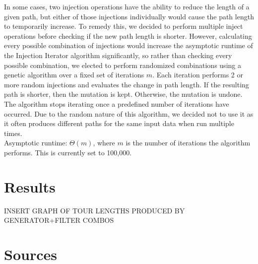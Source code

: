 \documentclass{article}
\begin{document}
In some cases, two injection operations have the ability to reduce the length
of a given path, but either of those injections individually would cause the
path length to temporarily increase. To remedy this, we decided to perform
multiple inject operations before checking if the new path length is shorter.
However, calculating every possible combination of injections would increase
the asymptotic runtime of the Injection Iterator algorithm significantly, so rather than checking every possible combination, we
elected to perform randomized combinations using a genetic algorithm over a
fixed set of iterations $m$. Each iteration performs 2 or more random
injections and evaluates the change in path length. If the resulting path is
shorter, then the mutation is kept. Otherwise, the mutation is undone. The
algorithm stops iterating once a predefined number of iterations have occurred.
Due to the random nature of this algorithm, we decided not to use it as it
often produces different paths for the same input data when run multiple
times.\\Asymptotic runtime: $\Theta (m)$, where $m$ is the number of iterations
the algorithm performs. This is currently set to 100,000.

\part*{Results}

INSERT GRAPH OF TOUR LENGTHS PRODUCED BY GENERATOR+FILTER COMBOS

\part*{Sources}
\end{document}
